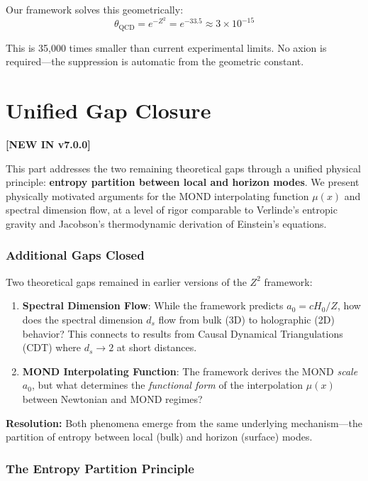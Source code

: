 \documentclass[11pt,a4paper]{article}
\theoremstyle{plain}
\theoremstyle{definition}
\theoremstyle{remark}
\begin{document}
Our framework solves this geometrically:
\[
\theta_{\text{QCD}} = e^{-Z^2} = e^{-33.5} \approx 3 \times 10^{-15}
\]

This is 35,000 times smaller than current experimental limits. No axion is required---the suppression is automatic from the geometric constant.

\part{Unified Gap Closure}
\textcolor{newcolor}{\textbf{[NEW IN v7.0.0]}}

This part addresses the two remaining theoretical gaps through a unified physical principle: \textbf{entropy partition between local and horizon modes}. We present physically motivated arguments for the MOND interpolating function $\mu(x)$ and spectral dimension flow, at a level of rigor comparable to Verlinde's entropic gravity and Jacobson's thermodynamic derivation of Einstein's equations.

\section{Additional Gaps Closed}

Two theoretical gaps remained in earlier versions of the $Z^2$ framework:

\begin{enumerate}
  \item \textbf{Spectral Dimension Flow}: While the framework predicts $a_0 = cH_0/Z$, how does the spectral dimension $d_s$ flow from bulk (3D) to holographic (2D) behavior? This connects to results from Causal Dynamical Triangulations (CDT) where $d_s \to 2$ at short distances.

  \item \textbf{MOND Interpolating Function}: The framework derives the MOND \emph{scale} $a_0$, but what determines the \emph{functional form} of the interpolation $\mu(x)$ between Newtonian and MOND regimes?
\end{enumerate}

\textbf{Resolution:} Both phenomena emerge from the same underlying mechanism---the partition of entropy between local (bulk) and horizon (surface) modes.

\section{The Entropy Partition Principle}
\end{document}
